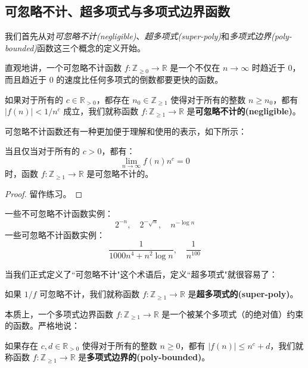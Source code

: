 \subsection{可忽略不计、超多项式与多项式边界函数}

我们首先从对\emph{可忽略不计(negligible)}、\emph{超多项式(super-poly)}和\emph{多项式边界(poly-bounded)}函数这三个概念的定义开始。

直观地讲，一个可忽略不计函数 $f:\mathbb{Z}_{\geq0}\to\mathbb{R}$ 是一个不仅在 $n\to\infty$ 时趋近于 $0$，而且趋近于 $0$ 的速度比任何多项式的倒数都要更快的函数。

\begin{definition}\label{def:2-5}
如果对于所有的 $c\in\mathbb{R}_{>0}$，都存在 $n_0\in\mathbb{Z}_{\geq 1}$ 使得对于所有的整数 $n\geq n_0$，都有 $|f(n)|<{1}/{n^c}$ 成立，我们就称函数 $f:\mathbb{Z}_{\geq1}\to\mathbb{R}$ 是\textbf{可忽略不计的(negligible)}。
\end{definition}

可忽略不计函数还有一种更加便于理解和使用的表示，如下所示：

\begin{theorem}
当且仅当对于所有的 $c>0$，都有：
\[
\lim_{n\to\infty}f(n)n^c=0
\]
时，函数 $f:\mathbb{Z}_{\geq1}\to\mathbb{R}$ 是可忽略不计的。
\end{theorem}

\begin{proof}
留作练习。
\end{proof}

\begin{example}
一些不可忽略不计函数实例：
\[
2^{-n},
\quad
2^{-\sqrt{n}},
\quad
n^{-\log n}
\]
一些可忽略不计函数实例：
\[
\frac{1}{1000n^4+n^2\log n},
\quad
\frac{1}{n^{100}}
\]
\end{example}

当我们正式定义了``可忽略不计"这个术语后，定义``超多项式"就很容易了：

\begin{definition}
如果 $1/f$ 可忽略不计，我们就称函数 $f:\mathbb{Z}_{\geq1}\to\mathbb{R}$ 是\textbf{超多项式的(super-poly)}。
\end{definition}

本质上，一个多项式边界函数 $f:\mathbb{Z}_{\geq1}\to\mathbb{R}$ 是一个被某个多项式（的绝对值）约束的函数。严格地说：

\begin{definition}
如果存在 $c,d\in\mathbb{R}_{>0}$ 使得对于所有的整数 $n\geq0$，都有 $|f(n)|\leq n^c+d$，我们就称函数 $f:\mathbb{Z}_{\geq1}\to\mathbb{R}$ 是\textbf{多项式边界的(poly-bounded)}。
\end{definition}

